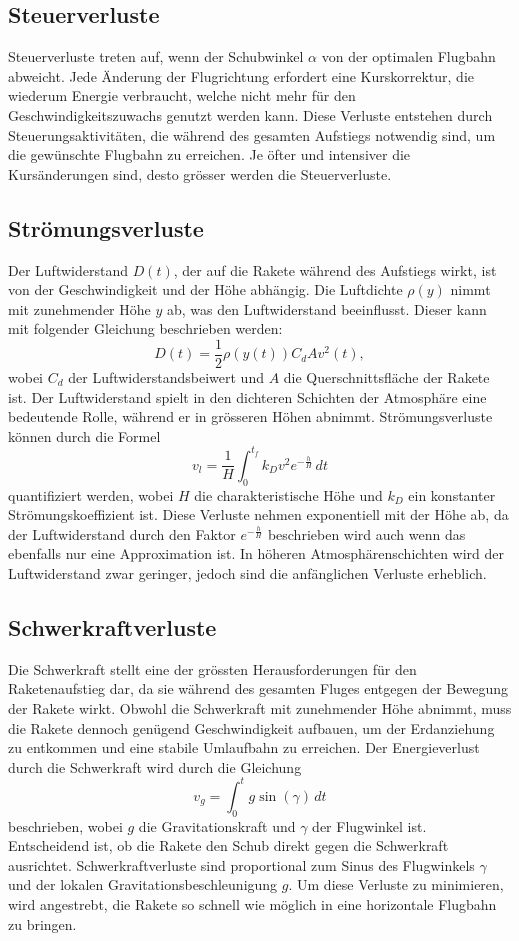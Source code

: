 \subsection{Steuerverluste}
Steuerverluste treten auf, wenn der Schubwinkel \(\alpha\) von der optimalen Flugbahn abweicht. 
Jede Änderung der Flugrichtung erfordert eine Kurskorrektur, die wiederum Energie verbraucht, welche nicht mehr für den Geschwindigkeitszuwachs genutzt werden kann. 
Diese Verluste entstehen durch Steuerungsaktivitäten, die während des gesamten Aufstiegs notwendig sind, um die gewünschte Flugbahn zu erreichen. 
Je öfter und intensiver die Kursänderungen sind, desto grösser werden die Steuerverluste.

\subsection{Strömungsverluste}
Der Luftwiderstand \(D(t)\), der auf die Rakete während des Aufstiegs wirkt, ist von der Geschwindigkeit und der Höhe abhängig. 
Die Luftdichte \(\rho(y)\) nimmt mit zunehmender Höhe \(y\) ab, was den Luftwiderstand beeinflusst. 
Dieser kann mit folgender Gleichung beschrieben werden:
\[
D(t) = \frac{1}{2} \rho(y(t)) C_d A v^2(t),
\]
wobei \(C_d\) der Luftwiderstandsbeiwert und \(A\) die Querschnittsfläche der Rakete ist. 
Der Luftwiderstand spielt in den dichteren Schichten der Atmosphäre eine bedeutende Rolle, während er in grösseren Höhen abnimmt.
Strömungsverluste können durch die Formel
\[
v_l = \frac{1}{H} \int_0^{t_f} k_D v^2 e^{-\frac{h}{H}} \, dt
\]
quantifiziert werden, wobei \(H\) die charakteristische Höhe und \(k_D\) ein konstanter Strömungskoeffizient ist. 
Diese Verluste nehmen exponentiell mit der Höhe ab, da der Luftwiderstand durch den Faktor \(e^{-\frac{h}{H}}\) beschrieben wird auch wenn das ebenfalls nur eine Approximation ist. 
In höheren Atmosphärenschichten wird der Luftwiderstand zwar geringer, jedoch sind die anfänglichen Verluste erheblich.

\subsection{Schwerkraftverluste}
Die Schwerkraft stellt eine der grössten Herausforderungen für den Raketenaufstieg dar, da sie während des gesamten Fluges entgegen der Bewegung der Rakete wirkt. 
Obwohl die Schwerkraft mit zunehmender Höhe abnimmt, muss die Rakete dennoch genügend Geschwindigkeit aufbauen, um der Erdanziehung zu entkommen und eine stabile Umlaufbahn zu erreichen. 
Der Energieverlust durch die Schwerkraft wird durch die Gleichung
\[
v_g = \int_0^t g \sin(\gamma) \, dt
\]
beschrieben, wobei \(g\) die Gravitationskraft und \(\gamma\) der Flugwinkel ist. 
Entscheidend ist, ob die Rakete den Schub direkt gegen die Schwerkraft ausrichtet.
Schwerkraftverluste sind proportional zum Sinus des Flugwinkels \(\gamma\) und der lokalen Gravitationsbeschleunigung \(g\). 
Um diese Verluste zu minimieren, wird angestrebt, die Rakete so schnell wie möglich in eine horizontale Flugbahn zu bringen.

